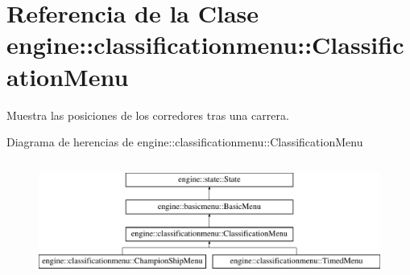 \hypertarget{classengine_1_1classificationmenu_1_1ClassificationMenu}{
\section{\-Referencia de la \-Clase engine\-:\-:classificationmenu\-:\-:\-Classification\-Menu}
\label{classengine_1_1classificationmenu_1_1ClassificationMenu}
}


\-Muestra las posiciones de los corredores tras una carrera.  


\-Diagrama de herencias de engine\-:\-:classificationmenu\-:\-:\-Classification\-Menu\begin{figure}[H]
\begin{center}
\leavevmode
\includegraphics[height=3.916084cm]{classengine_1_1classificationmenu_1_1ClassificationMenu}
\end{center}
\end{figure}
